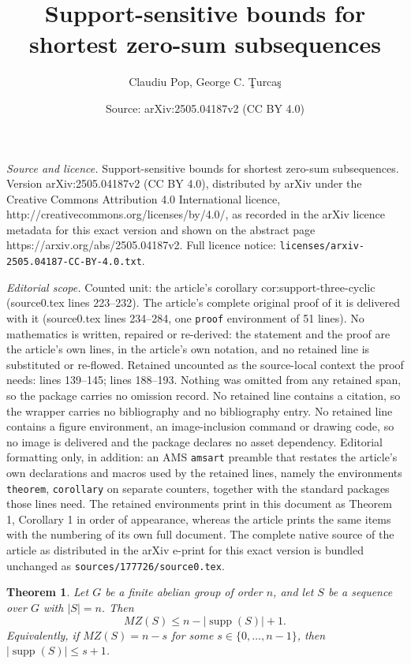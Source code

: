 \documentclass[10pt,a4paper]{amsart}
\title{Support-sensitive bounds for shortest zero-sum subsequences}
\author{Claudiu Pop, George C. \c{T}urca\c{s}}
\date{Source: arXiv:2505.04187v2 (CC BY 4.0)}
\newtheorem{theorem}{Theorem}
\DeclareMathOperator{\supp}{supp}
\begin{document}
\maketitle

\noindent\emph{Source and licence.} Support-sensitive bounds for shortest zero-sum subsequences. Version arXiv:2505.04187v2 (CC BY 4.0), distributed by arXiv under the Creative Commons Attribution 4.0 International licence, http://creativecommons.org/licenses/by/4.0/, as recorded in the arXiv licence metadata for this exact version and shown on the abstract page https://arxiv.org/abs/2505.04187v2. Full licence notice: \texttt{licenses/arxiv-2505.04187-CC-BY-4.0.txt}.\par\smallskip

\noindent\textit{Editorial scope.} Counted unit: the article's corollary cor:support-three-cyclic (source0.tex lines 223--232). The article's complete original proof of it is delivered with it (source0.tex lines 234--284, one \texttt{proof} environment of 51 lines). No mathematics is written, repaired or re-derived: the statement and the proof are the article's own lines, in the article's own notation, and no retained line is substituted or re-flowed.  Retained uncounted as the source-local context the proof needs: lines 139--145; lines 188--193.  Nothing was omitted from any retained span, so the package carries no omission record.  No retained line contains a citation, so the wrapper carries no bibliography and no bibliography entry.  No retained line contains a figure environment, an image-inclusion command or drawing code, so no image is delivered and the package declares no asset dependency.  Editorial formatting only, in addition: an AMS \texttt{amsart} preamble that restates the article's own declarations and macros used by the retained lines, namely the environments \texttt{theorem}, \texttt{corollary} on separate counters, together with the standard packages those lines need.  The retained environments print in this document as Theorem 1, Corollary 1 in order of appearance, whereas the article prints the same items with the numbering of its own full document.  The complete native source of the article as distributed in the arXiv e-print for this exact version is bundled unchanged as \texttt{sources/177726/source0.tex}.
\begin{theorem}\label{thm:finite-abelian-main}
Let $G$ be a finite abelian group of order $n$, and let $S$ be a sequence over $G$ with $|S|=n$.  Then
\[
  MZ(S)\le n-|\supp(S)|+1.
\]
Equivalently, if $MZ(S)=n-s$ for some $s\in\{0,\ldots,n-1\}$, then $|\supp(S)|\le s+1$.
\end{theorem}
\end{document}
